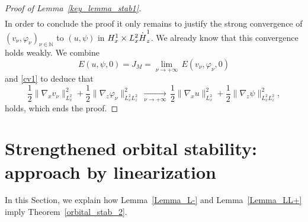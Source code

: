 \documentclass[11pt]{article}
\DeclareRobustCommand{\accentset}[2]{\overset{#1}{#2}}
\theoremstyle{definition}
\newcommand*{\overbigdot}[1]{%
\accentset{\mbox{\large\bfseries .}}{#1}}
\newenvironment{ProofOf}[1]{\begin{proof}[Proof of #1]}{\end{proof}}
\begin{document}
\begin{ProofOf}{Lemma~\ref{key_lemma_stab1}}
\begin{multline*}
\end{multline*}
\egroup
In order to conclude the proof it only remains to justify the strong convergence of $(v_{\nu},\varphi_{\nu})_{\nu\in\mathbb N}$ to $(u,\psi)$ in $H_{x}^{1}\times L_{x}^{2}\overbigdot{H}_{z}^{1}$. We already know that this convergence holds weakly. We combine
\[
E(u,\psi,0)=J_{M}=\underset{\nu\to+\infty}{\lim}\,E(v_{\nu},\varphi_{\nu},0)
\]
and \eqref{cv1} to deduce that
\[
\frac{1}{2}\|\nabla_{x}v_{\nu}\|_{L_{x}^{2}}^{2}+\frac{1}{2}\|\nabla_{z}\varphi_{\nu}\|_{L_{x}^{2}L_{z}^{2}}^{2}\,\underset{\nu\to+\infty}{\to}\,\frac{1}{2}\|\nabla_{x}u\|_{L_{x}^{2}}^{2}+\frac{1}{2}\|\nabla_{z}\psi\|_{L_{x}^{2}L_{z}^{2}}^{2},
\]
holds, which ends the proof.
\end{ProofOf}

\section{Strengthened orbital stability: approach by linearization}\label{OrbitalStability2}

In this Section, we explain how Lemma~\ref{Lemma_L-} and Lemma~\ref{Lemma_LL+} imply Theorem~\ref{orbital_stab_2}.
\end{document}
